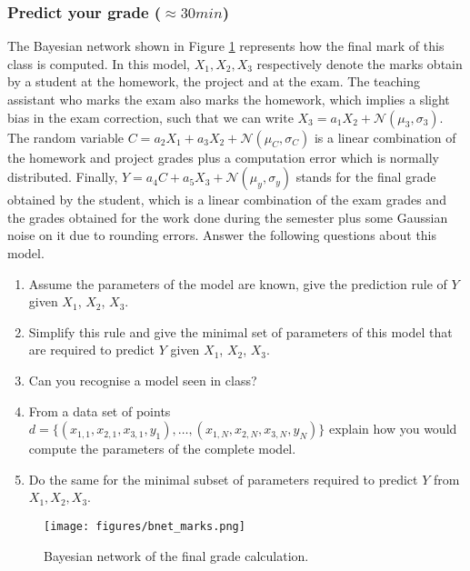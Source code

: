 \documentclass[a4paper, 10pt]{article}
\begin{document}
\subsubsection{Predict your grade ($\approx 30 min$)}
The Bayesian network shown in Figure \ref{fig:bnet_marks} represents how the final mark of this class is computed. In this model, $X_1, X_2, X_3$ respectively denote the marks obtain by a student at the homework, the project and at the exam. The teaching assistant who marks the exam also marks the homework, which implies a slight bias in the exam correction, such that we can write $X_3 = a_1X_2 + \mathcal{N}(\mu_3, \sigma_3)$. The random variable $C = a_2X_1 + a_3X_2 + \mathcal{N}(\mu_C, \sigma_C)$ is a linear combination of the homework and project grades plus a computation error which is normally distributed. Finally, $Y = a_4C + a_5 X_3 + \mathcal{N}(\mu_y, \sigma_y)$ stands for the final grade obtained by the student, which is a linear combination of the exam grades and the grades obtained for the work done during the semester plus some Gaussian noise on it due to rounding errors.
Answer the following questions about this model.
\begin{enumerate}
    \item Assume the parameters of the model are known, give the prediction rule of $Y$ given $X_1$, $X_2$, $X_3$.
    \item Simplify this rule and give the minimal set of parameters of this model that are required to predict $Y$ given $X_1$, $X_2$, $X_3$. 
    \item Can you recognise a model seen in class?
    \item From a data set of points $d = \{(x_{1, 1}, x_{2, 1}, x_{3, 1}, y_1), \hdots, (x_{1, N}, x_{2, N}, x_{3, N}, y_N)\}$ explain how you would compute the parameters of the complete model.
    \item Do the same for the minimal subset of parameters required to predict $Y$ from $X_1, X_2, X_3$.
\end{enumerate}
\begin{figure}[H]
    \centering
    \texttt{[image: figures/bnet\_marks.png]}
    \caption{Bayesian network of the final grade calculation.}
    \label{fig:bnet_marks}
\end{figure}
\end{document}

